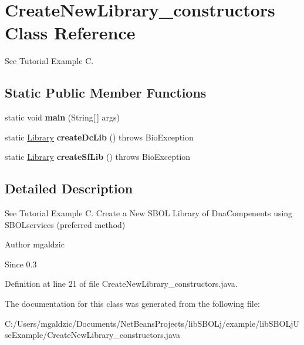 \hypertarget{classlib_s_b_o_lj_use_example_1_1_create_new_library__constructors}{
\section{CreateNewLibrary\_\-constructors Class Reference}
\label{classlib_s_b_o_lj_use_example_1_1_create_new_library__constructors}
}


See Tutorial Example C.  


\subsection*{Static Public Member Functions}
\begin{DoxyCompactItemize}
\item 
\hypertarget{classlib_s_b_o_lj_use_example_1_1_create_new_library__constructors_a8b260eecbaabcef8473fd87ada040682}{
static void {\bfseries main} (String\mbox{[}$\,$\mbox{]} args)}
\label{classlib_s_b_o_lj_use_example_1_1_create_new_library__constructors_a8b260eecbaabcef8473fd87ada040682}

\item 
\hypertarget{classlib_s_b_o_lj_use_example_1_1_create_new_library__constructors_ac932b1d0ece5ee59f5373be0c6a67dc5}{
static \hyperlink{classorg_1_1sbolstandard_1_1lib_s_b_o_lj_1_1_library}{Library} {\bfseries createDcLib} ()  throws BioException }
\label{classlib_s_b_o_lj_use_example_1_1_create_new_library__constructors_ac932b1d0ece5ee59f5373be0c6a67dc5}

\item 
\hypertarget{classlib_s_b_o_lj_use_example_1_1_create_new_library__constructors_a24b5949a85afe41f8c44da9d0d4547f2}{
static \hyperlink{classorg_1_1sbolstandard_1_1lib_s_b_o_lj_1_1_library}{Library} {\bfseries createSfLib} ()  throws BioException }
\label{classlib_s_b_o_lj_use_example_1_1_create_new_library__constructors_a24b5949a85afe41f8c44da9d0d4547f2}

\end{DoxyCompactItemize}


\subsection{Detailed Description}
See Tutorial Example C. Create a New SBOL Library of DnaCompenents using SBOLservices (preferred method) \begin{DoxyAuthor}{Author}
mgaldzic 
\end{DoxyAuthor}
\begin{DoxySince}{Since}
0.3 
\end{DoxySince}


Definition at line 21 of file CreateNewLibrary\_\-constructors.java.



The documentation for this class was generated from the following file:\begin{DoxyCompactItemize}
\item 
C:/Users/mgaldzic/Documents/NetBeansProjects/libSBOLj/example/libSBOLjUseExample/CreateNewLibrary\_\-constructors.java\end{DoxyCompactItemize}
